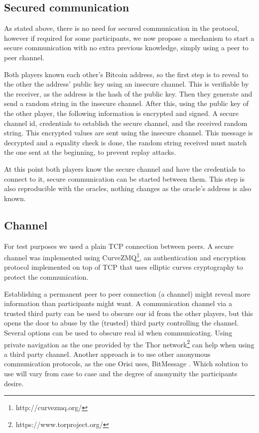 \subsection{Secured communication} \label{subsec:secured_comm}

As stated above, there is no need for secured communication in the protocol,
  however if required for some participants, we now propose a mechanism to
  start a secure communication with no extra previous knowledge, simply using
  a peer to peer channel.

Both players known each other's Bitcoin address, so the first step is to
  reveal to the other the address' public key using an insecure channel.
This is verifiable by the receiver, as the address is the hash of the public
  key.
Then they generate and send a random string in the insecure channel.
After this, using the public key of the other player, the following
  information is encrypted and signed.
A secure channel id, credentials to establish the secure channel, and the
  received random string. This encrypted values are sent using the insecure
  channel.
This message is decrypted and a equality check is done, the random string
  received must match the one sent at the beginning, to prevent replay
  attacks.

At this point both players know the secure channel and have the credentials
  to connect to it, secure communication can be started between them. This
  step is also reproducible with the oracles, nothing changes as the oracle's
  address is also known.

\subsection{Channel}

For test purposes we used a plain TCP connection between peers.
A secure channel was implemented using
  CurveZMQ\footnote{http://curvezmq.org/}, an authentication and encryption
  protocol implemented on top of TCP that uses elliptic curves cryptography to
  protect the communication.

Establishing a permanent peer to peer connection (a channel) might reveal more
  information than participants might want.
A communication channel via a trusted third party can be used to obscure our id
  from the other players, but this opens the door to abuse by the (trusted)
  third party controlling the channel.
Several options can be used to obscure real id when communicating.
Using private navigation as the one provided by the Thor network\footnote{%
    https://www.torproject.org/} can help when using a third party channel.
Another approach is to use other anonymous communication protocols, as the
  one Orisi uses, BitMessage \cite{warren2012bitmessage}.
Which solution to use will vary from case to case and the degree of anonymity
  the participants desire.

